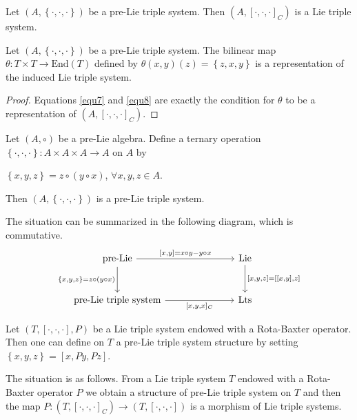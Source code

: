 \documentclass[11pt, twoside]{article}
\begin{document}
\begin{prop}[\cite{M21}]
    Let $(A,\left\{ \cdot,\cdot,\cdot\right\}) $ be a pre-Lie triple system. Then $(A,[\cdot,\cdot,\cdot]_C) $ is a Lie triple system. 
\end{prop}

\begin{prop}
    Let $(A,\left\{ \cdot,\cdot,\cdot\right\}) $ be a pre-Lie triple system. The bilinear map $\theta:T\times T\to \mathrm{End}(T)$ defined by $\theta(x,y)(z) = \left\{ z,x,y\right\} $ is a representation of the induced Lie triple system.
\end{prop}

\begin{proof}
    Equations \eqref{equ7} and \eqref{equ8} are exactly the condition for $\theta $ to be a representation of $(A,[\cdot,\cdot,\cdot]_C) $.
\end{proof}

\begin{prop}[\cite{M21}]
    Let $(A,\circ)$ be a pre-Lie algebra. Define a ternary operation $\left\{\cdot,\cdot,\cdot\right\}: A\times A\times A\to A $ on $A$ by \begin{center}
        $\left\{ x,y,z\right\}= z\circ (y\circ x) $, $\forall x,y,z\in A $.
    \end{center} Then $(A,\left\{\cdot,\cdot,\cdot\right\}) $ is a pre-Lie triple system.
\end{prop}

The situation can be summarized in the following diagram, which is commutative. \[\begin{tikzcd}[row sep=large, column sep=large]
	{\text{pre-Lie}} && \text{Lie} \\
	{ \text{pre-Lie triple system} } && \text{Lts}
	\arrow["{[x,y]=x\circ y - y\circ x}", from=1-1, to=1-3]
	\arrow["{\left\{ x,y,z\right\}= z\circ (y\circ x)}"', from=1-1, to=2-1]
	\arrow["{[x,y,z]=[[x,y],z]}", from=1-3, to=2-3]
	\arrow["{[x,y,x]_C}"', from=2-1, to=2-3]
\end{tikzcd}\]

\begin{prop}[\cite{M21}]
    Let $(T,[\cdot,\cdot,\cdot],P)$ be a Lie triple system endowed with a Rota-Baxter operator. Then one can define on $T$ a pre-Lie triple system structure by setting $\left\{x,y,z \right\}=[x,Py,Pz] $.
\end{prop}

The situation is as follows. From a Lie triple system $T$ endowed with a Rota-Baxter operator $P$ we obtain a structure of pre-Lie triple system on $T$ and then the map $P: (T,[\cdot,\cdot,\cdot]_C)\to (T,[\cdot,\cdot,\cdot]) $ is a morphism of Lie triple systems. 
\end{document}
